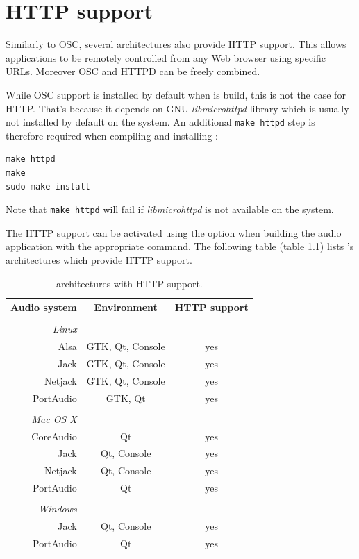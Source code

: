 \chapter{HTTP support} \label{sec:http}

Similarly to OSC, several \faust architectures also provide HTTP support. This allows \faust applications to be remotely controlled from any Web browser using specific URLs. Moreover OSC and HTTPD can be freely combined.

While OSC support is installed by default when \faust is build, this is not the case for HTTP. That's because it depends on GNU \emph{libmicrohttpd} library which is usually not installed by default on the system. An additional \lstinline'make httpd' step is therefore required when compiling and installing \faust:
\begin{lstlisting}
make httpd
make
sudo make install
\end{lstlisting}
Note that \lstinline'make httpd' will fail if \emph{libmicrohttpd} is not available on the system.

The HTTP support can be activated using the  option when building the audio application with the appropriate  command. The following table (table \ref{tab:httparch}) lists \faust's architectures which provide HTTP support. 

\begin{table}[htp]
\begin{center}
\begin{tabular}{rcc}
\hline
\bf{Audio system} 	& \bf{Environment} & \bf{HTTP support}	\\
\hline
\\
\emph{Linux}\\
Alsa  			& GTK, Qt, Console		& yes\\
Jack 			& GTK, Qt, Console		& yes\\
Netjack 			& GTK, Qt, Console & yes\\
PortAudio 		& GTK, Qt				& yes\\
\\
\emph{Mac OS X} \\
CoreAudio 		& Qt 			& yes\\
Jack 			& Qt, Console & yes\\
Netjack 			& Qt, Console & yes\\
PortAudio 		& Qt 			& yes\\
\\
\emph{Windows} \\
Jack 			& Qt, Console & yes\\
PortAudio 		& Qt 			& yes\\
\hline
\end{tabular}
\end{center}
\caption{\faust architectures with HTTP support.}
\label{tab:httparch}
\end{table}


